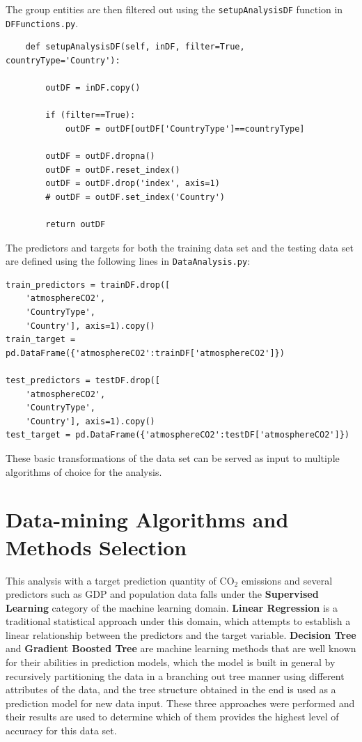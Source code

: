 \documentclass[11pt,a4paper,titlepage]{article}
\newcommand{\blankline}{\quad\pagebreak[2]}
\begin{document}
The group entities are then filtered out using the \texttt{setupAnalysisDF} function in \texttt{DFFunctions.py}. 

\begin{verbatim}
    def setupAnalysisDF(self, inDF, filter=True, countryType='Country'):

        outDF = inDF.copy()

        if (filter==True):
            outDF = outDF[outDF['CountryType']==countryType]

        outDF = outDF.dropna()
        outDF = outDF.reset_index()
        outDF = outDF.drop('index', axis=1)
        # outDF = outDF.set_index('Country')

        return outDF
\end{verbatim}

\blankline

The predictors and targets for both the training data set and the testing data set are defined using the following lines in \texttt{DataAnalysis.py}:

\begin{verbatim}
train_predictors = trainDF.drop([
    'atmosphereCO2',
    'CountryType',
    'Country'], axis=1).copy()
train_target = pd.DataFrame({'atmosphereCO2':trainDF['atmosphereCO2']})

test_predictors = testDF.drop([
    'atmosphereCO2',
    'CountryType',
    'Country'], axis=1).copy()
test_target = pd.DataFrame({'atmosphereCO2':testDF['atmosphereCO2']})
\end{verbatim}

\blankline

These basic transformations of the data set can be served as input to multiple algorithms of choice for the analysis.

\section{Data-mining Algorithms and Methods Selection}

This analysis with a target prediction quantity of CO$_{2}$ emissions and several predictors such as GDP and population data falls under the \textbf{Supervised Learning} category of the machine learning domain. \textbf{Linear Regression} is a traditional statistical approach under this domain, which attempts to establish a linear relationship between the predictors and the target variable. \textbf{Decision Tree} and \textbf{Gradient Boosted Tree} are machine learning methods that are well known for their abilities in prediction models, which the model is built in general by recursively partitioning the data in a branching out tree manner using different attributes of the data, and the tree structure obtained in the end is used as a prediction model for new data input. These three approaches were performed and their results are used to determine which of them provides the highest level of accuracy for this data set.
\end{document}
